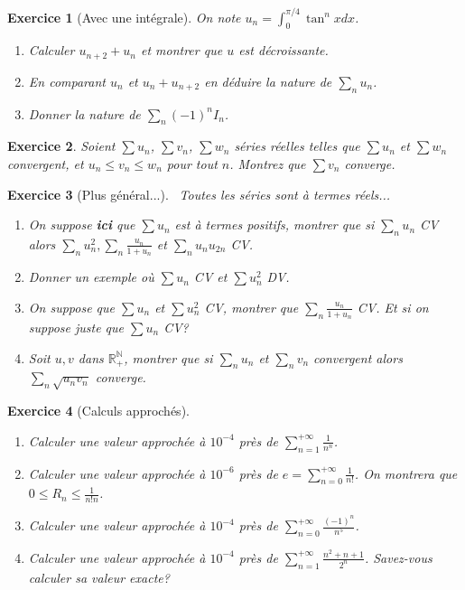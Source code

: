 \documentclass[12pt,a4paper]{article}
\newcommand{\R}{\mathbb{R}}
\newcommand{\N}{\mathbb{N}}
\theoremstyle{break}
\newtheorem{Exo}{Exercice}
\begin{document}
\begin{Exo}[Avec une intégrale] On note $u_n=\int_0^{\pi/4} \tan^n xdx$.
\begin{enumerate}
\item Calculer $u_{n+2}+u_n$ et montrer que $u$ est décroissante.
\item En comparant $u_n$ et $u_n+u_{n+2}$ en déduire la nature de $\sum_n u_n$.
\item
Donner la nature de $\sum_n(-1)^n I_n$.
\end{enumerate}
\end{Exo}

\begin{Exo}
	 Soient $\sum u_{n}$, $\sum v_{n}$, $\sum w_{n}$  séries réelles telles que $\sum u_{n}$ et $\sum w_{n}$ convergent,
et $u_{n}\leqslant v_{n}\leqslant w_{n}$ pour tout $n$. Montrez que $\sum v_{n}$ converge.

\end{Exo}


\begin{Exo}[Plus général...]
\ 
Toutes les séries sont à termes réels...
\begin{enumerate}
\item On suppose \textbf{ici} que $\sum u_n$ est à termes positifs, montrer que si $\sum_n u_n$ CV alors $\sum_n u_n^2,\sum_n \frac{u_n}{1+u_n}$ et $\sum_n u_n u_{2n}$ CV. 
\item Donner un exemple où $\sum u_n$ CV et $\sum u_n^2$ DV.
\item On suppose que $\sum u_n$  et $\sum u_n^2$ CV, montrer que $\sum_n \frac{u_n}{1+u_n}$ CV. Et si on suppose juste que $\sum u_n$ CV?
\item Soit $u,v$ dans $\R_+^{\N}$, montrer que si $\sum_n u_n$ et $\sum_n v_n$ convergent alors $\sum_n \sqrt{u_n v_n}$ converge.
\end{enumerate}
\end{Exo}







\begin{Exo}[Calculs approchés]
\ 

\begin{enumerate}
\item Calculer une valeur approchée à $10^{-4}$ près de $\sum_{n=1}^{+\infty}\frac{1}{n^n}$.
\item Calculer une valeur approchée à $10^{-6}$ près de $e=\sum_{n=0}^{+\infty}\frac{1}{n!}$. On montrera que $0\leq R_n\leqslant \frac{1}{n!n}$.
\item Calculer une valeur approchée à $10^{-4}$ près de $\sum_{n=0}^{+\infty}\frac{(-1)^n}{n^5}$.
\item Calculer une valeur approchée à $10^{-4}$ près de $\sum_{n=1}^{+\infty}\frac{n^2+n+1}{2^n}$. Savez-vous calculer sa valeur exacte?
\end{enumerate}
\end{Exo}
\end{document}
